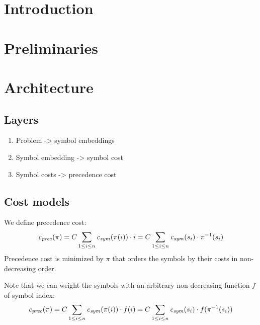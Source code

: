 \documentclass{article}
\begin{document}
\maketitle

\begin{abstract}

\end{abstract}

\section{Introduction}



\section{Preliminaries}

\section{Architecture}
\label{sec:architecture}

\subsection{Layers}

\begin{enumerate}
\item Problem -> symbol embeddings
\item Symbol embedding -> symbol cost
\item Symbol costs -> precedence cost
\end{enumerate}

\subsection{Cost models}


We define precedence cost:
$$
\operatorname{\mathit{\operatorname{\mathit{c}}_{prec}}}(\pi) =
C \sum_{1 \leq i \leq n} \operatorname{\mathit{\operatorname{\mathit{c}}_{sym}}}(\pi(i)) \cdot i =
C \sum_{1 \leq i \leq n} \operatorname{\mathit{\operatorname{\mathit{c}}_{sym}}}(s_i) \cdot \pi^{-1}(s_i)
$$
Precedence cost is minimized by $\pi$ that orders the symbols by their costs in non-decreasing order.

Note that we can weight the symbols with an arbitrary non-decreasing function $f$ of symbol index:
$$
\operatorname{\mathit{\operatorname{\mathit{c}}_{prec}}}(\pi) =
C \sum_{1 \leq i \leq n} \operatorname{\mathit{\operatorname{\mathit{c}}_{sym}}}(\pi(i)) \cdot f(i) =
C \sum_{1 \leq i \leq n} \operatorname{\mathit{\operatorname{\mathit{c}}_{sym}}}(s_i) \cdot f(\pi^{-1}(s_i))
$$
\end{document}
